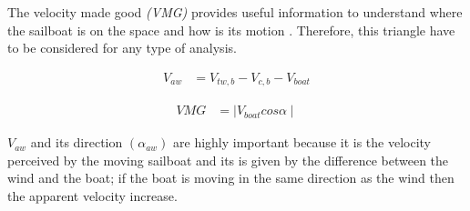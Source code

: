 The velocity made good \textit{(VMG)} provides useful information to understand where the sailboat is on the space and how is its motion \cite{larsonprinciples}. Therefore, this triangle have to be considered for any type of analysis.\par 
\begin{equation}
\label{eq_vel}
\begin{aligned}
V_{aw} & = V_{tw,b} - V_{c,b} - V_{boat}
\end{aligned}
\end {equation}

\begin{equation}
\label{eq:VMG}
\begin{aligned}
VMG &=  \mid V_{boat} cos \alpha  \mid 
\end{aligned}
\end {equation}

$V_{aw}$ and its direction $( \alpha_{aw})$ are highly important because it is the velocity perceived by the moving sailboat and its is given by the difference between the wind and the boat; if the boat is moving in the same direction as the wind then the apparent velocity increase. \par 

